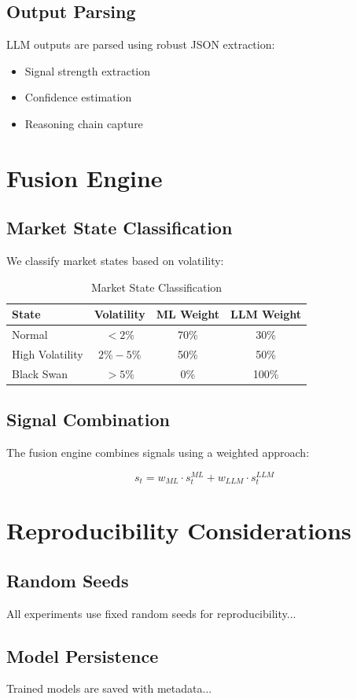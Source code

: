 \subsection{Output Parsing}

LLM outputs are parsed using robust JSON extraction:

\begin{itemize}
    \item Signal strength extraction
    \item Confidence estimation
    \item Reasoning chain capture
\end{itemize}

\section{Fusion Engine}

\subsection{Market State Classification}

We classify market states based on volatility:

\begin{table}[h]
\centering
\caption{Market State Classification}
\begin{tabular}{lccc}
\toprule
State & Volatility & ML Weight & LLM Weight \\
\midrule
Normal & $< 2\%$ & 70\% & 30\% \\
High Volatility & $2\% - 5\%$ & 50\% & 50\% \\
Black Swan & $> 5\%$ & 0\% & 100\% \\
\bottomrule
\end{tabular}
\end{table}

\subsection{Signal Combination}

The fusion engine combines signals using a weighted approach:

\begin{equation}
s_t = w_{ML} \cdot s_t^{ML} + w_{LLM} \cdot s_t^{LLM}
\end{equation}

\section{Reproducibility Considerations}

\subsection{Random Seeds}

All experiments use fixed random seeds for reproducibility...

\subsection{Model Persistence}

Trained models are saved with metadata...